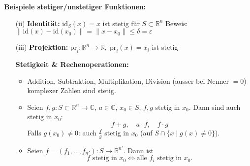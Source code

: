 \textbf{Beispiele stetiger/unstetiger Funktionen:}
\begin{itemize}
  \item[(ii)] \textbf{Identität:} $\mathrm{id}_S(x) = x$ ist stetig für $S \subset \mathbb{R}^n$  
  Beweis: $\|\mathrm{id}(x) - \mathrm{id}(x_0)\| = \|x - x_0\| \leq \delta = \varepsilon$

  \item[(iii)] \textbf{Projektion:} $\mathrm{pr}_i : \mathbb{R}^n \to \mathbb{R},\; \mathrm{pr}_i(x) = x_i$ ist stetig
%

%
\textbf{Stetigkeit \& Rechenoperationen:}
\begin{itemize}
  \item Addition, Subtraktion, Multiplikation, Division (ausser bei Nenner \(=0\)) komplexer Zahlen sind stetig.

  \item Seien \(f,g : S \subset \mathbb{R}^n \to \mathbb{C}\), \(a \in \mathbb{C}\), \(x_0 \in S\), \(f,g\) stetig in \(x_0\). Dann sind auch stetig in \(x_0\):  
  \[
  f + g,\quad a \cdot f,\quad f \cdot g
  \]
  Falls \(g(x_0) \ne 0\): auch \(\frac{f}{g}\) stetig in \(x_0\) (auf \(S \cap \{x \mid g(x) \ne 0\}\)).

  \item Seien \(f = (f_1, \dots, f_{n'}) : S \to \mathbb{R}^{n'}\). Dann ist  
  \[
  f \text{ stetig in } x_0 \iff \text{alle } f_i \text{ stetig in } x_0.
  \]
\end{itemize}


\end{itemize}

